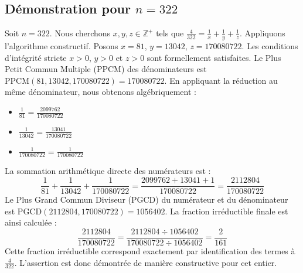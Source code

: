 \documentclass[11pt,a4paper]{article}
\begin{document}
\subsection{Démonstration pour $n = 322$}
Soit $n = 322$. Nous cherchons $x, y, z \in \mathbb{Z}^{+}$ tels que $\frac{4}{322} = \frac{1}{x} + \frac{1}{y} + \frac{1}{z}$.
Appliquons l'algorithme constructif. Posons $x = 81$, $y = 13042$, $z = 170080722$.
Les conditions d'intégrité stricte $x > 0$, $y > 0$ et $z > 0$ sont formellement satisfaites.
Le Plus Petit Commun Multiple (PPCM) des dénominateurs est $\text{PPCM}(81, 13042, 170080722) = 170080722$.
En appliquant la réduction au même dénominateur, nous obtenons algébriquement :
\begin{itemize}
    \item $\frac{1}{81} = \frac{2099762}{170080722}$
    \item $\frac{1}{13042} = \frac{13041}{170080722}$
    \item $\frac{1}{170080722} = \frac{1}{170080722}$
\end{itemize}
La sommation arithmétique directe des numérateurs est :
$$ \frac{1}{81} + \frac{1}{13042} + \frac{1}{170080722} = \frac{2099762 + 13041 + 1}{170080722} = \frac{2112804}{170080722} $$
Le Plus Grand Commun Diviseur (PGCD) du numérateur et du dénominateur est $\text{PGCD}(2112804, 170080722) = 1056402$.
La fraction irréductible finale est ainsi calculée :
$$ \frac{2112804}{170080722} = \frac{2112804 \div 1056402}{170080722 \div 1056402} = \frac{2}{161} $$
Cette fraction irréductible correspond exactement par identification des termes à $\frac{4}{322}$. L'assertion est donc démontrée de manière constructive pour cet entier.
\end{document}
